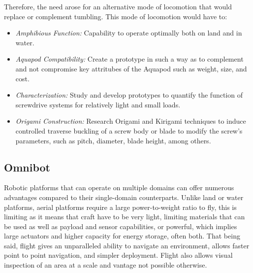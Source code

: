 Therefore, the need arose for an alternative mode of locomotion that would replace or complement tumbling. This mode of locomotion would have to:

\begin{itemize}
	\item \emph{Amphibious Function:} Capability to operate optimally both on land and in water. 
	\item \emph{Aquapod Compatibility:} Create a prototype in such a way as to complement and not compromise key attritubes of the Aquapod such as weight, size, and cost. 
	\item \emph{Characterization:} Study and develop prototypes to quantify the function of screwdrive systems for relatively light and small loads. 
	\item \emph{Origami Construction:} Research Origami and Kirigami techniques to induce controlled traverse buckling of a screw body or blade to modify the screw's parameters, such as pitch, diameter, blade height, among others. 
\end{itemize}
	

\subsection{Omnibot}

Robotic platforms that can operate on multiple domains can offer numerous advantages compared to their single-domain counterparts. Unlike land or water platforms, aerial platforms require a large power-to-weight ratio to fly, this is limiting as it means that craft have to be very light, limiting materials that can be used as well as payload and sensor capabilities, or powerful, which implies large actuators and higher capacity for energy storage, often both. That being said, flight gives an unparalleled ability to navigate an environment, allows faster point to point navigation, and simpler deployment. Flight also allows visual inspection of an area at a scale and vantage not possible otherwise.

